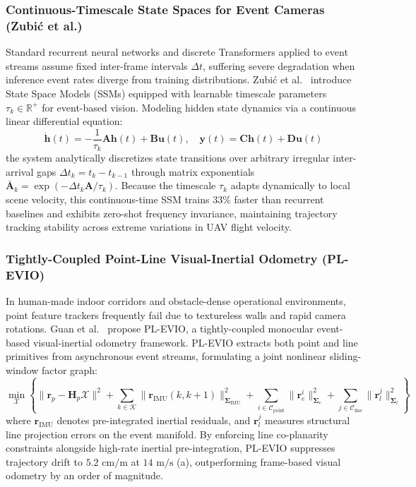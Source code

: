 \subsubsection{Continuous-Timescale State Spaces for Event Cameras (Zubić et al.)}
Standard recurrent neural networks and discrete Transformers applied to event streams assume fixed inter-frame intervals $\Delta t$, suffering severe degradation when inference event rates diverge from training distributions. Zubić et al.~\cite{Zubic2024SSM} introduce State Space Models (SSMs) equipped with learnable timescale parameters $\tau_k \in \mathbb{R}^+$ for event-based vision. Modeling hidden state dynamics via a continuous linear differential equation:
\begin{equation}
    \dot{\mathbf{h}}(t) = -\frac{1}{\tau_k}\mathbf{A}\mathbf{h}(t) + \mathbf{B}\mathbf{u}(t), \quad \mathbf{y}(t) = \mathbf{C}\mathbf{h}(t) + \mathbf{D}\mathbf{u}(t)
\end{equation}
the system analytically discretizes state transitions over arbitrary irregular inter-arrival gaps $\Delta t_k = t_k - t_{k-1}$ through matrix exponentials $\bar{\mathbf{A}}_k = \exp(-\Delta t_k \mathbf{A} / \tau_k)$. Because the timescale $\tau_k$ adapts dynamically to local scene velocity, this continuous-time SSM trains $33\%$ faster than recurrent baselines and exhibits zero-shot frequency invariance, maintaining trajectory tracking stability across extreme variations in UAV flight velocity.

\subsubsection{Tightly-Coupled Point-Line Visual-Inertial Odometry (PL-EVIO)}
In human-made indoor corridors and obstacle-dense operational environments, point feature trackers frequently fail due to textureless walls and rapid camera rotations. Guan et al.~\cite{Guan2022PLEVIO} propose PL-EVIO, a tightly-coupled monocular event-based visual-inertial odometry framework. PL-EVIO extracts both point and line primitives from asynchronous event streams, formulating a joint nonlinear sliding-window factor graph:
\begin{equation}
    \min_{\mathcal{X}} \left\{ \|\mathbf{r}_p - \mathbf{H}_p \mathcal{X}\|^2 + \sum_{k \in \mathcal{K}} \|\mathbf{r}_{\text{IMU}}(k, k+1)\|^2_{\mathbf{\Sigma}_{\text{IMU}}} + \sum_{i \in \mathcal{C}_{\text{point}}} \|\mathbf{r}_e^i\|^2_{\mathbf{\Sigma}_e} + \sum_{j \in \mathcal{C}_{\text{line}}} \|\mathbf{r}_l^j\|^2_{\mathbf{\Sigma}_l} \right\}
\end{equation}
where $\mathbf{r}_{\text{IMU}}$ denotes pre-integrated inertial residuals, and $\mathbf{r}_l^j$ measures structural line projection errors on the event manifold. By enforcing line co-planarity constraints alongside high-rate inertial pre-integration, PL-EVIO suppresses trajectory drift to $5.2\text{ cm/m}$ at $14\text{ m/s}$ (a), outperforming frame-based visual odometry by an order of magnitude.

